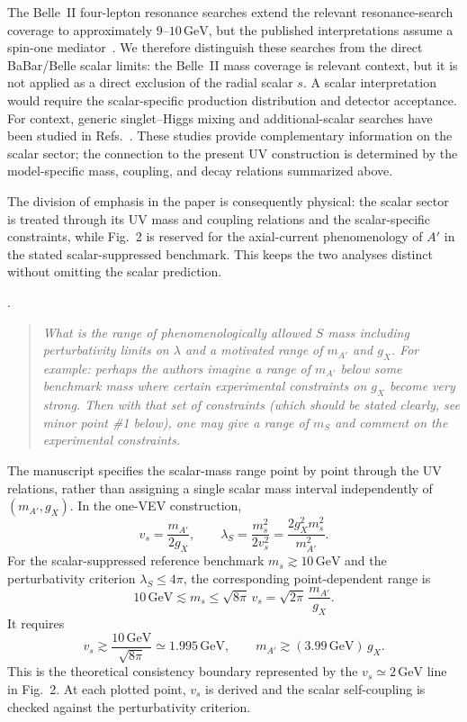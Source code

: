 \documentclass[12pt,a4paper]{article}
\begin{document}
The Belle~II four-lepton resonance searches extend the relevant resonance-search coverage to approximately \(9\text{--}10\,\mathrm{GeV}\), but the published interpretations assume a spin-one mediator~\cite{Belle-II:2024wtd,Belle-II:2023ydz}. We therefore distinguish these searches from the direct BaBar/Belle scalar limits: the Belle~II mass coverage is relevant context, but it is not applied as a direct exclusion of the radial scalar \(s\). A scalar interpretation would require the scalar-specific production distribution and detector acceptance. For context, generic singlet--Higgs mixing and additional-scalar searches have been studied in Refs.~\cite{Robens:2015singlet,Robens:2020twoSinglets,Boiarska:2019scalarPortal}. These studies provide complementary information on the scalar sector; the connection to the present UV construction is determined by the model-specific mass, coupling, and decay relations summarized above.

The division of emphasis in the paper is consequently physical: the scalar sector is treated through its UV mass and coupling relations and the scalar-specific constraints, while Fig.~2 is reserved for the axial-current phenomenology of \(A'\) in the stated scalar-suppressed benchmark. This keeps the two analyses distinct without omitting the scalar prediction.

\medskip
{}. \begin{quote}\itshape
What is the range of phenomenologically allowed \(S\) mass including perturbativity limits on \(\lambda\) and a motivated range of \(m_{A'}\) and \(g_X\). For example: perhaps the authors imagine a range of \(m_{A'}\) below some benchmark mass where certain experimental constraints on \(g_X\) become very strong. Then with that set of constraints (which should be stated clearly, see minor point \#1 below), one may give a range of \(m_S\) and comment on the experimental constraints.\end{quote}

The manuscript specifies the scalar-mass range point by point through the UV relations, rather than assigning a single scalar mass interval independently of \((m_{A'},g_X)\). In the one-VEV construction,
\[
v_s=\frac{m_{A'}}{2g_X},
\qquad
\lambda_S=\frac{m_s^2}{2v_s^2}
=\frac{2g_X^2m_s^2}{m_{A'}^2}.
\]
For the scalar-suppressed reference benchmark \(m_s\gtrsim10\,\mathrm{GeV}\) and the perturbativity criterion \(\lambda_S\leq4\pi\), the corresponding point-dependent range is
\[
10\,\mathrm{GeV}\lesssim m_s\leq\sqrt{8\pi}\,v_s
=\sqrt{2\pi}\,\frac{m_{A'}}{g_X}.
\]
It requires
\[
v_s\gtrsim\frac{10\,\mathrm{GeV}}{\sqrt{8\pi}}
\simeq1.995\,\mathrm{GeV},
\qquad
m_{A'}\gtrsim(3.99\,\mathrm{GeV})\,g_X.
\]
This is the theoretical consistency boundary represented by the \(v_s\simeq2\,\mathrm{GeV}\) line in Fig.~2. At each plotted point, \(v_s\) is derived and the scalar self-coupling is checked against the perturbativity criterion.
\end{document}
